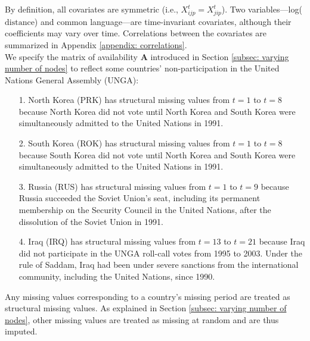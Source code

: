 \documentclass[a4paper]{article}
\begin{document}
By definition, all covariates are symmetric (i.e., $X^t_{ijp}=X^t_{jip}$). Two variables---log($\mbox{distance}$) and common language---are time-invariant covariates, although their coefficients may vary over time. Correlations between the covariates are summarized in Appendix \ref{appendix: correlations}.\\\newline
We specify the matrix of availability $\mathbf{A}$ introduced in Section \ref{subsec: varying number of nodes} to reflect some countries' non-participation in the United Nations General Assembly (UNGA): 
\begin{itemize}
	\item[1.]  North Korea (PRK) has structural missing values from $t = 1$ to $t = 8$ because North Korea did not vote until North Korea and South Korea were simultaneously admitted to the United Nations in 1991.
	\item[2.] South Korea (ROK) has structural missing values from $t = 1$ to $t = 8$ because South Korea did not vote until North Korea and South Korea were simultaneously admitted to the United Nations in 1991.
	\item [3.] Russia (RUS) has structural missing values from $t=1$ to $t =9$ because Russia succeeded the Soviet Union's seat, including its permanent membership on the Security Council in the United Nations, after the dissolution of the Soviet Union in 1991. 
	\item [4.] Iraq (IRQ) has structural missing values from $t =13$ to $t = 21$ because Iraq did not participate in the UNGA roll-call votes from 1995 to 2003. Under the rule of Saddam, Iraq had been under severe sanctions from the international community, including the United Nations, since 1990.
\end{itemize}
Any missing values corresponding to a country's missing period are treated as structural missing values. As explained in Section \ref{subsec: varying number of nodes}, other missing values are treated as missing at random and are thus imputed.
\end{document}
